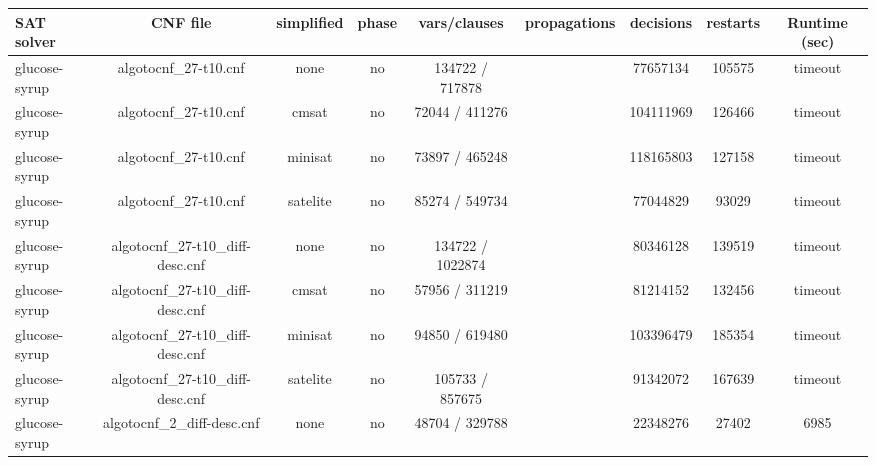 \begin{appendices}
\begin{table}[p]
  \begin{center}
    \begin{tabular}{l|cccccccc}
        \textbf{SAT solver} & \textbf{CNF file} & \textbf{simplified} & \textbf{phase} & \textbf{vars/clauses} & \textbf{propagations} & \textbf{decisions} & \textbf{restarts} & \textbf{Runtime (sec)} \\
      \hline
  glucose-syrup                  & algotocnf\_27-t10.cnf          & none       & no    & 134722 / 717878 &           & 77657134  & 105575     & timeout \\ %
  glucose-syrup                  & algotocnf\_27-t10.cnf          & cmsat      & no    & 72044 / 411276 &           & 104111969 & 126466     & timeout \\ %
  glucose-syrup                  & algotocnf\_27-t10.cnf          & minisat    & no    & 73897 / 465248 &           & 118165803 & 127158     & timeout \\ %
  glucose-syrup                  & algotocnf\_27-t10.cnf          & satelite   & no    & 85274 / 549734 &           & 77044829  & 93029      & timeout \\ %
  glucose-syrup                  & algotocnf\_27-t10\_diff-desc.cnf & none       & no    & 134722 / 1022874 &           & 80346128  & 139519     & timeout \\ %
  glucose-syrup                  & algotocnf\_27-t10\_diff-desc.cnf & cmsat      & no    & 57956 / 311219 &           & 81214152  & 132456     & timeout \\ %
  glucose-syrup                  & algotocnf\_27-t10\_diff-desc.cnf & minisat    & no    & 94850 / 619480 &           & 103396479 & 185354     & timeout \\ %
  glucose-syrup                  & algotocnf\_27-t10\_diff-desc.cnf & satelite   & no    & 105733 / 857675 &           & 91342072  & 167639     & timeout \\ %
  glucose-syrup                  & algotocnf\_2\_diff-desc.cnf    & none       & no    & 48704 / 329788 &           & 22348276  & 27402      & 6985 \\ %

\end{tabular}
\end{center}
\end{table}
\end{appendices}
